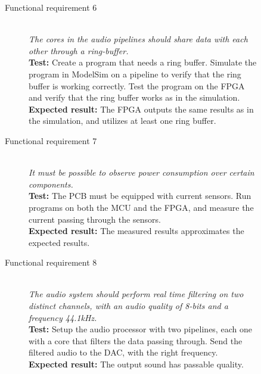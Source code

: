 \begin{figure}[H]
    \label{test:func-test6}
    \begin{description}
        \item[Functional requirement 6] \hfill \\
            \textit{The cores in the audio pipelines should share data with each other through a ring-buffer.} \\
            \textbf{Test:} Create a program that needs a ring buffer.
            Simulate the program in ModelSim on a pipeline to verify that
            the ring buffer is working correctly.
            Test the program on the FPGA and verify that the ring buffer
            works as in the simulation. \\
            \textbf{Expected result:} The FPGA outputs the same results as in the simulation, and utilizes at least one ring buffer.
    \end{description}
\end{figure}

\begin{figure}[H]
    \label{test:func-test7}
    \begin{description}
        \item[Functional requirement 7] \hfill \\
            \textit{It must be possible to observe power consumption over certain components.} \\
            \textbf{Test:} The PCB must be equipped with current sensors. Run programs
            on both the MCU and the FPGA, and measure the current passing through the sensors. \\
            \textbf{Expected result:} The measured results approximates the expected results.
    \end{description}
\end{figure}

\begin{figure}[H]
    \label{test:func-test8}
    \begin{description}
        \item[Functional requirement 8] \hfill \\
            \textit{The audio system should perform real time filtering on
            two distinct channels, with an audio quality of 8-bits and a frequency 44.1kHz.} \\
            \textbf{Test:} Setup the audio processor with two pipelines, each one with a core
            that filters the data passing through. Send the filtered audio to the DAC, with the
            right frequency. \\
            \textbf{Expected result:} The output sound has passable quality.
    \end{description}
\end{figure}

